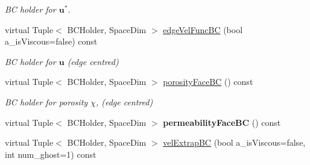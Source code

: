 \begin{DoxyCompactItemize}
\begin{DoxyCompactList}\small\item\em B\-C holder for $ \mathbf{u}^* $. \end{DoxyCompactList}\item 
\hypertarget{class_phys_b_c_util_a2925ca7d7b6a788bd84a8d4316000194}{virtual Tuple$<$ B\-C\-Holder, Space\-Dim $>$ \hyperlink{class_phys_b_c_util_a2925ca7d7b6a788bd84a8d4316000194}{edge\-Vel\-Func\-B\-C} (bool a\-\_\-is\-Viscous=false) const }\label{class_phys_b_c_util_a2925ca7d7b6a788bd84a8d4316000194}

\begin{DoxyCompactList}\small\item\em B\-C holder for $ \mathbf{u} $ (edge centred) \end{DoxyCompactList}\item 
\hypertarget{class_phys_b_c_util_a18a9e464ba4ebbc126de38b7678c87dc}{virtual Tuple$<$ B\-C\-Holder, Space\-Dim $>$ \hyperlink{class_phys_b_c_util_a18a9e464ba4ebbc126de38b7678c87dc}{porosity\-Face\-B\-C} () const }\label{class_phys_b_c_util_a18a9e464ba4ebbc126de38b7678c87dc}

\begin{DoxyCompactList}\small\item\em B\-C holder for porosity $ \chi $, (edge centred) \end{DoxyCompactList}\item 
\hypertarget{class_phys_b_c_util_a7bbf17a8fb9f268c1315cd663b69b9b7}{virtual Tuple$<$ B\-C\-Holder, Space\-Dim $>$ {\bfseries permeability\-Face\-B\-C} () const }\label{class_phys_b_c_util_a7bbf17a8fb9f268c1315cd663b69b9b7}

\item 
\hypertarget{class_phys_b_c_util_a247e8d8fe685f3a9ef56884d08c82fb9}{virtual Tuple$<$ B\-C\-Holder, Space\-Dim $>$ \hyperlink{class_phys_b_c_util_a247e8d8fe685f3a9ef56884d08c82fb9}{vel\-Extrap\-B\-C} (bool a\-\_\-is\-Viscous=false, int num\-\_\-ghost=1) const }\label{class_phys_b_c_util_a247e8d8fe685f3a9ef56884d08c82fb9}


\end{DoxyCompactItemize}
